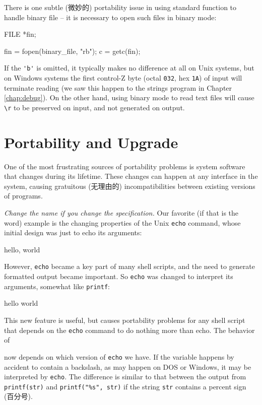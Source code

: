 There is one subtle (微妙的) portability issue in using standard function
to handle binary file -- it is necessary to open such files in binary mode:
\begin{wellcode}
    FILE *fin;

    fin = fopen(binary_file, "rb");
    c = getc(fin);
\end{wellcode}

If the \verb"'b'" is omitted, it typically makes no difference at all on
Unix systems, but on Windows systems the first control-Z byte (octal
\verb'032', hex \verb'1A') of input will terminate reading (we saw this
happen to the strings program in Chapter \ref{chap:debug}). On the other
hand, using binary mode to read text files will cause \verb'\r' to be
preserved on input, and not generated on output.

\section{Portability and Upgrade}
\label{sec:portability_upgrade}

One of the most frustrating sources of portability problems is system
software that changes during its lifetime. These changes can happen at any
interface in the system, causing gratuitous (无理由的) incompatibilities
between existing versions of programs.

\emph{Change the name if you change the specification.} Our favorite (if
that is the word) example is the changing properties of the Unix
\verb'echo' command, whose initial design was just to echo its arguments:
\begin{wellcode}
    hello, world
\end{wellcode}
However, \verb'echo' became a key part of many shell scripts, and the need
to generate formatted output became important. So \verb'echo' was changed
to interpret its arguments, somewhat like \verb'printf':
\begin{wellcode}
    hello
    world
\end{wellcode}
This new feature is useful, but causes portability problems for any shell
script that depends on the \verb'echo' command to do nothing more than
echo. The behavior of
\begin{wellcode}
\end{wellcode}
now depends on which version of \verb'echo' we have. If the variable
happens by accident to contain a backslash, as may happen on DOS or
Windows, it may be interpreted by \verb'echo'. The difference is similar to
that between the output from \verb'printf(str)' and
\verb'printf("%s", str)' if the string \verb'str' contains a percent sign
(百分号).

